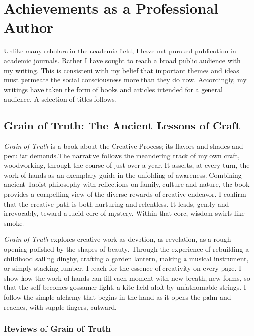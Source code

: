 \documentclass[10pt,DIV09,letterpaper,oneside,headsepline]{scrreprt}
\begin{document}
\chapter{Achievements as a Professional Author}

Unlike many scholars in the academic field, I have not pursued publication in academic journals. Rather I have sought to reach a broad public audience with my writing. This is consistent with my belief that important themes and ideas must permeate the social consciousness more than they do now. Accordingly, my writings have taken the form of books and articles intended for a general audience. A selection of titles follows.

\clearpage

\section{Grain of Truth: The Ancient Lessons of Craft}

\textit{Grain of Truth} is a book about the Creative Process; its flavors and shades and peculiar demands.The narrative follows the meandering track of my own craft, woodworking, through the course of just over a year. It asserts, at every turn, the work of hands as an exemplary guide in the unfolding of awareness. Combining ancient Taoist philosophy with reflections on family, culture and nature, the book provides a compelling view of the diverse rewards of creative endeavor. I confirm that the creative path is both nurturing and relentless. It leads, gently and irrevocably, toward a lucid core of mystery. Within that core, wisdom swirls like smoke.

\textit{Grain of Truth} explores creative work as devotion, as revelation, as a rough opening polished by the shapes of beauty. Through the experience of rebuilding a childhood sailing dinghy, crafting a garden lantern, making a musical instrument, or simply stacking lumber, I reach for the essence of creativity on every page. I show how the work of hands can fill each moment with new breath, new forms, so that the self becomes gossamer-light, a kite held aloft by unfathomable strings. I follow the simple alchemy that begins in the hand as it opens the palm and reaches, with supple fingers, outward.

\subsection{Reviews of Grain of Truth}
\end{document}
